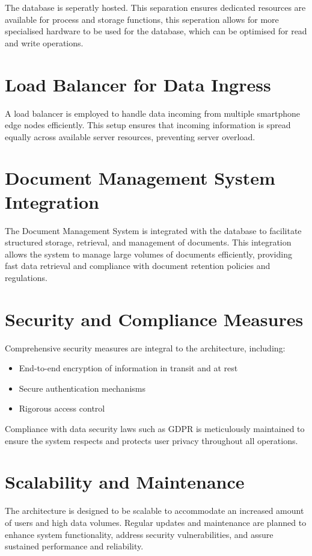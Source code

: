\noindent{}The database is seperatly hosted. This separation ensures dedicated resources
are available for process and storage functions, this seperation allows for more
specialised hardware to be used for the database, which can be optimised for
read and write operations. \cite{liu2024integrating}

\section{Load Balancer for Data Ingress}
A load balancer is employed to handle data incoming from multiple smartphone
edge nodes efficiently. This setup ensures that incoming information is spread
equally across available server resources, preventing server overload.

\section{Document Management System Integration}
The Document Management System is integrated with the database to facilitate
structured storage, retrieval, and management of documents. This integration
allows the system to manage large volumes of documents efficiently, providing
fast data retrieval and compliance with document retention policies and
regulations.

\section{Security and Compliance Measures}
Comprehensive security measures are integral to the architecture, including:

\begin{itemize}
    \item End-to-end encryption of information in transit and at rest
    \item Secure authentication mechanisms
    \item Rigorous access control
\end{itemize}

\noindent{}Compliance with data security laws such as GDPR is meticulously maintained to
ensure the system respects and protects user privacy throughout all operations.

\section{Scalability and Maintenance}
The architecture is designed to be scalable to accommodate an increased amount of
users and high data volumes. Regular updates and maintenance are planned to
enhance system functionality, address security vulnerabilities, and assure
sustained performance and reliability.